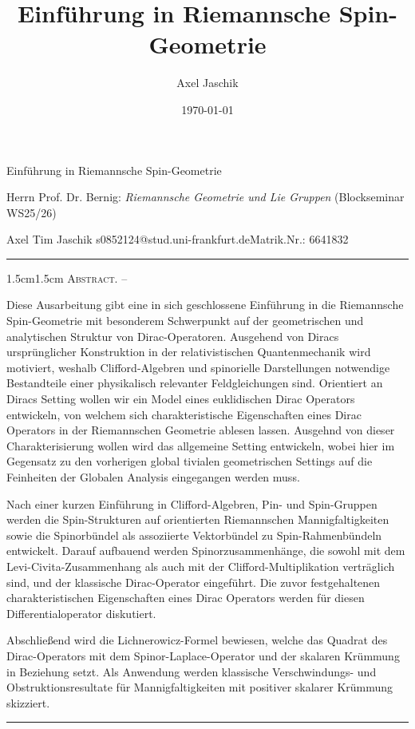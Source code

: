 \documentclass[10pt, letterpaper]{article}
\title{Einführung in Riemannsche Spin-Geometrie}
\author{Axel Jaschik}
\date{\today}
\renewenvironment{abstract}
  {
    \begin{adjustwidth}{1.5cm}{1.5cm}
    \small
    \textsc{Abstract. –}%
  }
  {
    \end{adjustwidth}
  }
\begin{document}
\begin{center}
    \Large{Einführung in Riemannsche Spin-Geometrie}\\[10pt]
\end{center}
\vspace{0.1cm}

\begin{center}
     {Herrn Prof. Dr. Bernig: \textit{Riemannsche Geometrie und Lie Gruppen} (Blockseminar WS25/26)}\\
\end{center}


\begin{center}
    \footnotesize{Axel Tim Jaschik \qquad s0852124@stud.uni-frankfurt.de\qquad Matrik.Nr.: 6641832}
\end{center}

\rule{\textwidth}{0.5pt}
\begin{abstract}
Diese Ausarbeitung gibt eine in sich geschlossene Einführung in die Riemannsche Spin-Geometrie mit besonderem Schwerpunkt auf der geometrischen und analytischen Struktur von Dirac-Operatoren. Ausgehend von Diracs ursprünglicher Konstruktion in der relativistischen Quantenmechanik wird motiviert, weshalb Clifford-Algebren und spinorielle Darstellungen notwendige Bestandteile einer physikalisch relevanter Feldgleichungen sind. Orientiert an Diracs Setting wollen wir ein Model eines euklidischen Dirac Operators entwickeln, von welchem sich charakteristische Eigenschaften eines Dirac Operators in der Riemannschen Geometrie ablesen lassen. Ausgehnd von dieser Charakterisierung wollen wird das allgemeine Setting entwickeln, wobei hier im Gegensatz zu den vorherigen global tivialen geometrischen Settings auf die Feinheiten der Globalen Analysis eingegangen werden muss. 

Nach einer kurzen Einführung in Clifford-Algebren, Pin- und Spin-Gruppen werden die Spin-Strukturen auf orientierten Riemannschen Mannigfaltigkeiten sowie die Spinorbündel als assoziierte Vektorbündel zu Spin-Rahmenbündeln entwickelt. Darauf aufbauend werden Spinorzusammenhänge, die sowohl mit dem Levi-Civita-Zusammenhang als auch mit der Clifford-Multiplikation verträglich sind, und der klassische Dirac-Operator eingeführt. Die zuvor festgehaltenen charakteristischen Eigenschaften eines Dirac Operators werden für diesen Differentialoperator diskutiert.

Abschließend wird die Lichnerowicz-Formel bewiesen, welche das Quadrat des Dirac-Operators mit dem Spinor-Laplace-Operator und der skalaren Krümmung in Beziehung setzt. Als Anwendung werden klassische Verschwindungs- und Obstruktionsresultate für Mannigfaltigkeiten mit positiver skalarer Krümmung skizziert.
\end{abstract}
\rule{\textwidth}{0.5pt}
\vspace{0.1cm}
\end{document}
